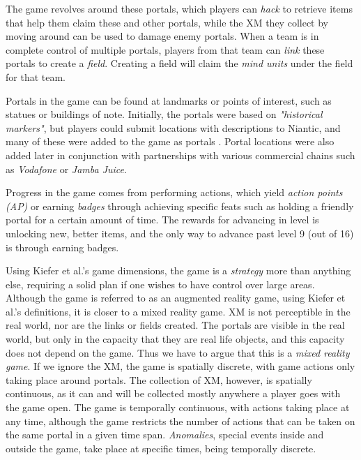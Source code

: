The game revolves around these portals, which players can \emph{hack} to retrieve items that help them claim these and other portals, while the XM they collect by moving around can be used to damage enemy portals. When a team is in complete control of multiple portals, players from that team can \emph{link} these portals to create a \emph{field}. Creating a field will claim the \emph{mind units} under the field for that team.

Portals in the game can be found at landmarks or points of interest, such as statues or buildings of note. Initially, the portals were based on \emph{"historical markers"}, but players could submit locations with descriptions to Niantic, and many of these were added to the game as portals \cite{mashableHanke}. Portal locations were also added later in conjunction with partnerships with various commercial chains such as \emph{Vodafone} \cite{auroraPromotion} or \emph{Jamba Juice}.

Progress in the game comes from performing actions, which yield \emph{action points (AP)} or earning \emph{badges} through achieving specific feats such as holding a friendly portal for a certain amount of time. The rewards for advancing in level is unlocking new, better items, and the only way to advance past level 9 (out of 16) is through earning badges.

Using Kiefer et al.'s \cite{kiefer2006systematically} game dimensions, the game is a \emph{strategy} more than anything else, requiring a solid plan if one wishes to have control over large areas. Although the game is referred to as an augmented reality game, using Kiefer et al.'s definitions, it is closer to a mixed reality game. XM is not perceptible in the real world, nor are the links or fields created. The portals are visible in the real world, but only in the capacity that they are real life objects, and this capacity does not depend on the game. Thus we have to argue that this is a \emph{mixed reality game}. If we ignore the XM, the game is spatially discrete, with game actions only taking place around portals. The collection of XM, however, is spatially continuous, as it can and will be collected mostly anywhere a player goes with the game open. The game is temporally continuous, with actions taking place at any time, although the game restricts the number of actions that can be taken on the same portal in a given time span. \emph{Anomalies}, special events inside and outside the game, take place at specific times, being temporally discrete.

